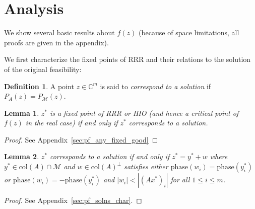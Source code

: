 \documentclass[12pt]{article}
\newtheorem{lemma}{Lemma}
\theoremstyle{definition}
\newtheorem{definition}{Definition}
\theoremstyle{remark}
\theoremstyle{definition}
\theoremstyle{problem}
\theoremstyle{definition}
\newcommand{\blem}{\begin{lemma}}
\newcommand{\elem}{\end{lemma}}
\newcommand{\bpof}{\begin{proof}}
\newcommand{\epof}{\end{proof}}
\newcommand{\bdefn}{\begin{definition}}
\newcommand{\edefn}{\end{definition}}
\newcommand{\col}{\text{col}}
\newcommand{\CC}{\mathbb{C}}
\newcommand{\MM}{\mathcal{M}}
\newcommand{\TODO}[1]{{\color{red}{[#1]}}}
\begin{document}
%
%
%

\section{Analysis}

We show several basic results about $f(z)$ (because of space limitations, all proofs are given in the appendix).

We first characterize the fixed points of RRR and their relations to the solution of the original feasibility:
\bdefn\label{defn:soln} A point $z\in\CC^m$ is said to \emph{correspond to a solution} if $P_A(z) = P_{\MM}(z)$. \edefn

\blem\label{lem:any_fixed_is_good} $z^*$ is a fixed point of RRR or HIO (and hence a critical point of $f(z)$ in the real case) if and only if $z^*$ corresponds to a solution. \elem
\bpof See Appendix~\ref{sec:pf_any_fixed_good} \epof

\blem\label{lem:solns_char} $z^*$ corresponds to a solution if and only if $z^* = y^* + w$ where $y^*\in\col(A)\cap \MM$ and $w\in\col(A)^{\perp}$ satisfies either $\text{phase}(w_i) = \text{phase}(y^*_i)$ or $\text{phase}(w_i) = -\text{phase}(y^*_i)$ and $|w_i|<|(Ax^*)_i|$ for all $1\leq i\leq m$. \elem
\bpof  See Appendix~\ref{sec:pf_solns_char}. \epof
\end{document}
